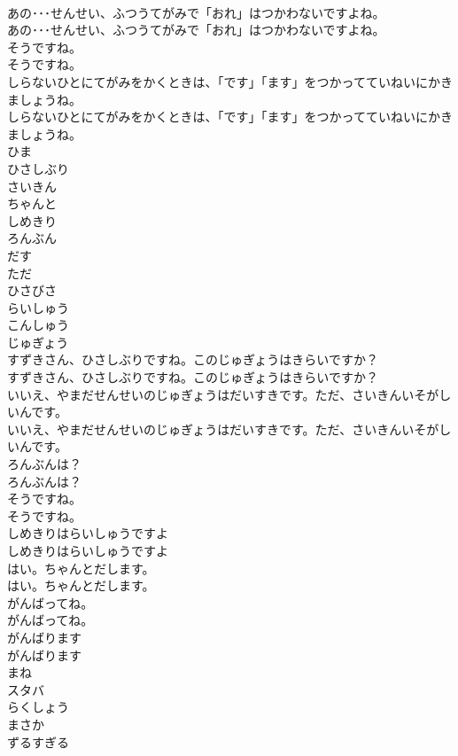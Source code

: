 \documentclass[8pt]{extreport}
\begin{document}
\begin{CJK}{UTF8}{min}
\\	あの･･･せんせい、ふつうてがみで「おれ」はつかわないですよね。
\\	あの･･･せんせい、ふつうてがみで「おれ」はつかわないですよね。
\\	そうですね。
\\	そうですね。
\\	しらないひとにてがみをかくときは、「です」「ます」をつかってていねいにかきましょうね。
\\	しらないひとにてがみをかくときは、「です」「ます」をつかってていねいにかきましょうね。
\\	ひま
\\	ひさしぶり
\\	さいきん
\\	ちゃんと
\\	しめきり
\\	ろんぶん
\\	だす
\\	ただ
\\	ひさびさ
\\	らいしゅう
\\	こんしゅう
\\	じゅぎょう
\\	すずきさん、ひさしぶりですね。このじゅぎょうはきらいですか？
\\	すずきさん、ひさしぶりですね。このじゅぎょうはきらいですか？
\\	いいえ、やまだせんせいのじゅぎょうはだいすきです。ただ、さいきんいそがしいんです。
\\	いいえ、やまだせんせいのじゅぎょうはだいすきです。ただ、さいきんいそがしいんです。
\\	ろんぶんは？
\\	ろんぶんは？
\\	そうですね。
\\	そうですね。
\\	しめきりはらいしゅうですよ
\\	しめきりはらいしゅうですよ
\\	はい。ちゃんとだします。
\\	はい。ちゃんとだします。
\\	がんばってね。
\\	がんばってね。
\\	がんばります
\\	がんばります
\\	まね
\\	スタバ
\\	らくしょう
\\	まさか
\\	ずるすぎる

\end{CJK}
\end{document}
